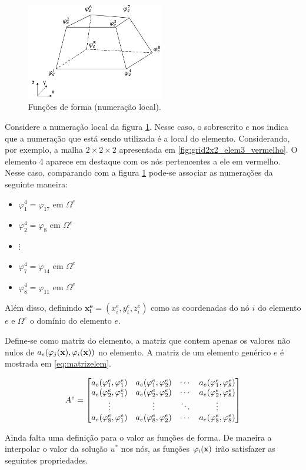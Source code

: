 \begin{figure}[!htbp]
\centering
\includegraphics[width=6cm]{chap01/elemento_original_func_forma.png}
\caption{Funções de forma (numeração local).}
\label{fig:elem_func_form_local}
\end{figure}


Considere a numeração local da figura \ref{fig:elem_func_form_local}. Nesse caso, o sobrescrito $e$ nos indica que a numeração que está sendo utilizada é a local do elemento. Considerando, por exemplo, a malha $2\times2\times2$ apresentada em \ref{fig:grid2x2_elem3_vermelho}. O elemento 4 aparece em destaque com os nós pertencentes a ele em vermelho. Nesse caso, comparando com a figura \ref{fig:elem_func_form_local} pode-se associar as numerações da seguinte maneira:

\begin{itemize}
   \item $\varphi^4_1=\varphi_{17}$ em $\Omega^e$
   \item $\varphi^4_2=\varphi_{8}$ em $\Omega^e$
   \item $\vdots$
   \item $\varphi^4_7=\varphi_{14}$ em $\Omega^e$
   \item $\varphi^4_8=\varphi_{11}$ em $\Omega^e$
\end{itemize}




Além disso, definindo $\mathbf{x^e_i} = (x^e_i, y^e_i, z^e_i)$ como as coordenadas do nó $i$ do elemento $e$ e $\Omega^e$ o domínio do elemento $e$.



Define-se como matriz do elemento, a matriz que contem apenas os valores não nulos de $a_e(\varphi_j(\mathbf{x}),\varphi_i(\mathbf{x}))$ no elemento. A matriz de um elemento genérico $e$ é mostrada em \ref{eq:matrizelem}.

\begin{equation}
\label{eq:matrizelem}
A^e = \begin{bmatrix} a_e(\varphi^e_{1}, \varphi^e_{1}) & a_e(\varphi^e_{1}, \varphi^e_{2}) & \cdots & a_e(\varphi^e_{1}, \varphi^e_{8}) \\ a_e(\varphi^e_{2}, \varphi^e_{1}) & a_e(\varphi^e_{2}, \varphi^e_{2}) & \cdots & a_e(\varphi^e_{2}, \varphi^e_{8}) \\ \vdots & \vdots & \ddots & \vdots \\ a_e(\varphi^e_{8}, \varphi^e_{1}) & a_e(\varphi^e_{8}, \varphi^e_{2}) & \cdots & a_e(\varphi^e_{8}, \varphi^e_{8}) \\ \end{bmatrix}
\end{equation}


Ainda falta uma definição para o valor as funções de forma. De maneira a interpolar o valor da solução $u^*$ nos nós, as funções $\varphi_i(\mathbf{x})$ irão satisfazer as seguintes propriedades.

